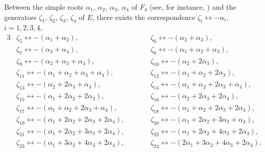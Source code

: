 \documentclass[11pt]{article}
\numberwithin{equation}{section}
\numberwithin{equation}{section}
\theoremstyle{definition}
\newcommand{\0}{\boldsymbol{0}}
\begin{document}
\begin{Remark}\label{correspondence-generators-roots}
Between the simple roots $\alpha_1$, $\alpha_2$, $\alpha_3$, $\alpha_4$ of $F_4$ (see, for instance, \cite{Bourbaki}) and
the generators $\zeta_1$, $\zeta_2$, $\zeta_3$, $\zeta_4$ of $E$, there exists the correspondence
$\zeta_i \longleftrightarrow -\alpha_i$, $i = 1, 2, 3, 4$,
\begin{alignat*}{3}
&\zeta_5 \longleftrightarrow - (\alpha_1 + \alpha_2), \qquad&&
\zeta_6 \longleftrightarrow -(\alpha_2 + \alpha_3), & \\
&\zeta_7 \longleftrightarrow -(\alpha_3 + \alpha_4), \qquad&&
\zeta_8 \longleftrightarrow -(\alpha_1 + \alpha_2 + \alpha_3), \\
&\zeta_9 \longleftrightarrow -(\alpha_2 + \alpha_3 + \alpha_4), \qquad&&
\zeta_{10} \longleftrightarrow -(\alpha_2 + 2\alpha_3), \\
&\zeta_{11} \longleftrightarrow -(\alpha_1 + \alpha_2 + \alpha_3 + \alpha_4), \qquad&&
\zeta_{12} \longleftrightarrow -(\alpha_1 + \alpha_2 + 2\alpha_3), \\
&\zeta_{13} \longleftrightarrow -(\alpha_2 + 2\alpha_3 + \alpha_4), \qquad&&
\zeta_{14} \longleftrightarrow -(\alpha_1 + \alpha_2 + 2\alpha_3 + \alpha_4), \\
&\zeta_{15} \longleftrightarrow -(\alpha_1 + 2\alpha_2 + 2\alpha_3), \qquad&&
\zeta_{16} \longleftrightarrow -(\alpha_2 + 2\alpha_3 + 2\alpha_4), \\
&\zeta_{17} \longleftrightarrow -(\alpha_1 + \alpha_2 + 2\alpha_3 + \alpha_4), \qquad&&
\zeta_{18} \longleftrightarrow -(\alpha_1 + \alpha_2 + 2\alpha_3 + 2\alpha_4), \\
&\zeta_{19} \longleftrightarrow -(\alpha_1 + 2\alpha_2 + 2\alpha_3 + 2\alpha_4), \qquad&&
\zeta_{20} \longleftrightarrow -(\alpha_1 + 2\alpha_2 + 3\alpha_3 + \alpha_4), \\
&\zeta_{21} \longleftrightarrow -(\alpha_1 + 2\alpha_2 + 3\alpha_3 + 2\alpha_4), \qquad&&
\zeta_{22} \longleftrightarrow -(\alpha_1 + 2\alpha_2 + 4\alpha_3 + 2\alpha_4),\\
&\zeta_{23} \longleftrightarrow -(\alpha_1 + 3\alpha_2 + 4\alpha_3 + 2\alpha_4), \qquad&&
\zeta_{24} \longleftrightarrow -(2\alpha_1 + 3\alpha_2 + 4\alpha_3 + 2\alpha_4).
\end{alignat*}
\end{Remark}
\end{document}
